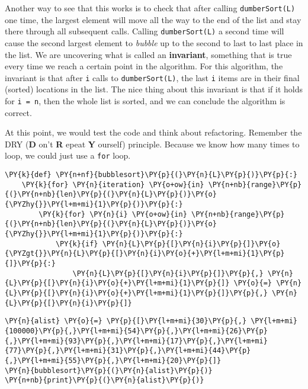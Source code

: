 Another way to see that this works is to check that after calling \texttt{dumberSort(L)} one time, the largest element will move all the way to the end of the list and stay there through all subsequent calls.  Calling \texttt{dumberSort(L)} a second time will cause the second largest element to \emph{bubble} up to the second to last to last place in the list.  We are uncovering what is called an \textbf{invariant}, something that is true every time we reach a certain point in the algorithm.  For this algorithm, the invariant is that after \texttt{i} calls to \texttt{dumberSort(L)}, the last \texttt{i} items are in their final (sorted) locations in the list.  The nice thing about this invariant is that if it holds for \texttt{i = n}, then the whole list is sorted, and we can conclude the algorithm is correct.


At this point, we would test the code and think about refactoring.  Remember the DRY (\textbf{D} on't \textbf{R} epeat \textbf{Y} ourself) principle.  Because we know how many times to loop, we could just use a \texttt{for} loop.  

\begin{Verbatim}[commandchars=\\\{\}]
\PY{k}{def} \PY{n+nf}{bubblesort}\PY{p}{(}\PY{n}{L}\PY{p}{)}\PY{p}{:}
    \PY{k}{for} \PY{n}{iteration} \PY{o+ow}{in} \PY{n+nb}{range}\PY{p}{(}\PY{n+nb}{len}\PY{p}{(}\PY{n}{L}\PY{p}{)}\PY{o}{\PYZhy{}}\PY{l+m+mi}{1}\PY{p}{)}\PY{p}{:}
        \PY{k}{for} \PY{n}{i} \PY{o+ow}{in} \PY{n+nb}{range}\PY{p}{(}\PY{n+nb}{len}\PY{p}{(}\PY{n}{L}\PY{p}{)}\PY{o}{\PYZhy{}}\PY{l+m+mi}{1}\PY{p}{)}\PY{p}{:}
            \PY{k}{if} \PY{n}{L}\PY{p}{[}\PY{n}{i}\PY{p}{]}\PY{o}{\PYZgt{}}\PY{n}{L}\PY{p}{[}\PY{n}{i}\PY{o}{+}\PY{l+m+mi}{1}\PY{p}{]}\PY{p}{:}
                \PY{n}{L}\PY{p}{[}\PY{n}{i}\PY{p}{]}\PY{p}{,} \PY{n}{L}\PY{p}{[}\PY{n}{i}\PY{o}{+}\PY{l+m+mi}{1}\PY{p}{]} \PY{o}{=} \PY{n}{L}\PY{p}{[}\PY{n}{i}\PY{o}{+}\PY{l+m+mi}{1}\PY{p}{]}\PY{p}{,} \PY{n}{L}\PY{p}{[}\PY{n}{i}\PY{p}{]}
\end{Verbatim}



\begin{Verbatim}[commandchars=\\\{\}]
\PY{n}{alist} \PY{o}{=} \PY{p}{[}\PY{l+m+mi}{30}\PY{p}{,} \PY{l+m+mi}{100000}\PY{p}{,}\PY{l+m+mi}{54}\PY{p}{,}\PY{l+m+mi}{26}\PY{p}{,}\PY{l+m+mi}{93}\PY{p}{,}\PY{l+m+mi}{17}\PY{p}{,}\PY{l+m+mi}{77}\PY{p}{,}\PY{l+m+mi}{31}\PY{p}{,}\PY{l+m+mi}{44}\PY{p}{,}\PY{l+m+mi}{55}\PY{p}{,}\PY{l+m+mi}{20}\PY{p}{]}
\PY{n}{bubblesort}\PY{p}{(}\PY{n}{alist}\PY{p}{)}
\PY{n+nb}{print}\PY{p}{(}\PY{n}{alist}\PY{p}{)}
\end{Verbatim}


